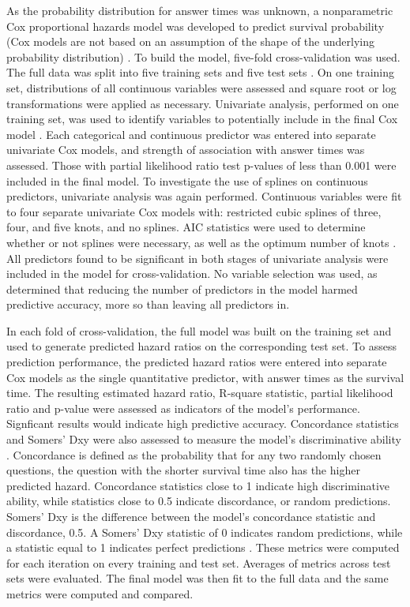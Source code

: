 \documentclass{article}
\begin{document}
As the probability distribution for answer times was unknown, a nonparametric Cox proportional hazards model was developed to predict survival probability (Cox models are not based on an assumption of the shape of the underlying probability distribution) \citep{Moore2010}. To build the model, five-fold cross-validation was used. The full data was split into five training sets and five test sets \citep{sensitivity}. On one training set, distributions of all continuous variables were assessed and square root or log transformations were applied as necessary. Univariate analysis, performed on one training set, was used to identify variables to potentially include in the final Cox model \citep{Hammer}. Each categorical and continuous predictor was entered into separate univariate Cox models, and strength of association with answer times was assessed. Those with partial likelihood ratio test p-values of less than 0.001 were included in the final model. To investigate the use of splines on continuous predictors, univariate analysis was again performed. Continuous variables were fit to four separate univariate Cox models with: restricted cubic splines of three, four, and five knots, and no splines. AIC statistics were used to determine whether or not splines were necessary, as well as the optimum number of knots \citep{Harrell2015}. All predictors found to be significant in both stages of univariate analysis were included in the model for cross-validation. No variable selection was used, as \cite{Harrell2015} determined that reducing the number of predictors in the model harmed predictive accuracy, more so than leaving all predictors in. 

In each fold of cross-validation, the full model was built on the training set and used to generate predicted hazard ratios on the corresponding test set. To assess prediction performance, the predicted hazard ratios were entered into separate Cox models as the single quantitative predictor, with answer times as the survival time. The resulting estimated hazard ratio, R-square statistic, partial likelihood ratio and p-value were assessed as indicators of the model's performance. Signficant results would indicate high predictive accuracy. Concordance statistics and Somers' Dxy were also assessed to measure the model's discriminative ability \citep{Chen}. Concordance is defined as the probability that for any two randomly chosen questions, the question with the shorter survival time also has the higher predicted hazard. Concordance statistics close to 1 indicate high discriminative ability, while statistics close to 0.5 indicate discordance, or random predictions. Somers' Dxy is the difference between the model's concordance statistic and discordance, 0.5. A Somers' Dxy statistic of 0 indicates random predictions, while a statistic equal to 1 indicates perfect predictions \citep{Harrell2015}. These metrics were computed for each iteration on every training and test set. Averages of metrics across test sets were evaluated. The final model was then fit to the full data and the same metrics were computed and compared. 
\end{document}
